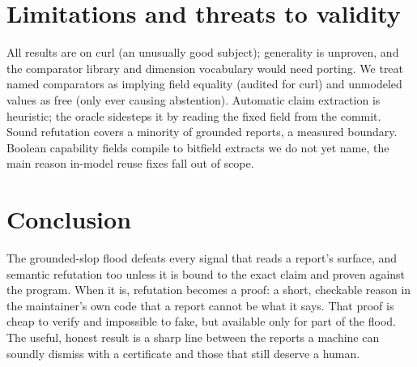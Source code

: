 \documentclass[11pt]{article}
\begin{document}
\section{Limitations and threats to validity}
All results are on curl (an unusually good subject); generality is unproven, and the comparator library and
dimension vocabulary would need porting. We treat named comparators as implying field equality (audited for curl)
and unmodeled values as free (only ever causing abstention). Automatic claim extraction is heuristic; the oracle
sidesteps it by reading the fixed field from the commit. Sound refutation covers a minority of grounded reports, a
measured boundary. Boolean capability fields compile to bitfield extracts we do not yet name, the main reason
in-model reuse fixes fall out of scope.

\section{Conclusion}
The grounded-slop flood defeats every signal that reads a report's surface, and semantic refutation too unless it is
bound to the exact claim and proven against the program. When it is, refutation becomes a proof: a short, checkable
reason in the maintainer's own code that a report cannot be what it says. That proof is cheap to verify and
impossible to fake, but available only for part of the flood. The useful, honest result is a sharp line between the
reports a machine can soundly dismiss with a certificate and those that still deserve a human.
\end{document}
